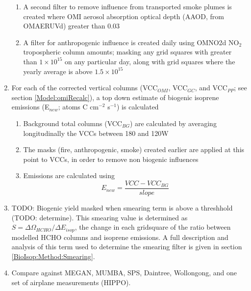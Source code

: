 \begin{enumerate}
\begin{enumerate}
        \item 
          A second filter to remove influence from transported smoke plumes is created where OMI aerosol absorption optical depth (AAOD, from OMAERUVd) greater than 0.03
        \item 
          A filter for anthropogenic influence is created daily using OMNO2d NO$_2$ tropospheric column amounts; masking any grid squares with greater than $1\times 10 ^{15}$ on any particular day, along with grid squares where the yearly average is above $1.5 \times 10^{15}$\moleccm
      \end{enumerate}
      \item For each of the corrected vertical columns (VCC$_{OMI}$, VCC$_{GC}$, and VCC$_{PP}$; see section \ref{Model:omiRecalc}), a top down estimate of biogenic isoprene emissions (E$_{new}$; atoms C cm$^{-2}$ s$^{-1}$) is calculated
      \begin{enumerate}
        \item 
          Background total columns (VCC$_{BG}$) are calculated by averaging longitudinally the VCCs between 180 and 120\degr W
        \item 
          The masks (fire, anthropogenic, smoke) created earlier are applied at this point to VCCs, in order to remove non biogenic influences
        \item
          Emissions are calculated using 
          \begin{equation} \label{BioIsop:Method:eqn_Enew}
            E_{new} = \frac{VCC - VCC_{BG}}{slope}
          \end{equation}
      \end{enumerate}
      \item
        TODO: Biogenic yield masked when smearing term is above a threshhold (TODO: determine).
        This smearing value is determined as $S=\Delta \Omega_{HCHO}/ \Delta E_{isop}$, the change in each gridsquare of the ratio between modelled HCHO columns and isoprene emissions. 
        A full description and analysis of this term used to determine the smearing filter is given in section \ref{BioIsop:Method:Smearing}.
      \item 
        Compare against MEGAN, MUMBA, SPS, Daintree, Wollongong, and one set of airplane measurements (HIPPO).
    \end{enumerate}
    
  
